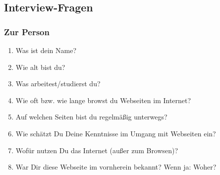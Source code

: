 \subsection*{Interview-Fragen}
\subsubsection*{Zur Person}
\begin{enumerate}
	\item Was ist dein Name?
	\item Wie alt bist du?
	\item Was arbeitest/studierst du?
	\item Wie oft bzw. wie lange browst du Webseiten im Internet?
	\item Auf welchen Seiten bist du regelmäßig unterwegs?
	\item Wie schätzt Du Deine Kenntnisse im Umgang mit Webseiten ein?
	\item Wofür nutzen Du das Internet (außer zum Browsen)?
	\item War Dir diese Webseite im vornherein bekannt? Wenn ja: Woher?
\end{enumerate}

